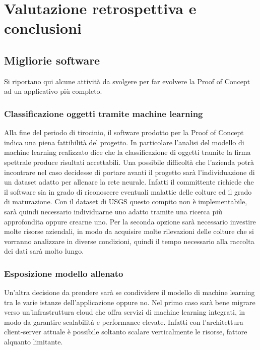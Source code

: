 
\chapter{Valutazione retrospettiva e conclusioni}
\label{cap:conclusione}


\section{Migliorie software}
Si riportano qui alcune attività da svolgere per far evolvere la Proof of Concept ad un applicativo più completo.

\subsection{Classificazione oggetti tramite machine learning}
Alla fine del periodo di tirocinio, il software prodotto per la Proof of Concept indica una piena fattibilità del progetto. In particolare l'analisi del modello di machine learning realizzato dice che la classificazione di oggetti tramite la firma spettrale produce risultati accettabili. Una possibile difficoltà che l'azienda potrà incontrare nel caso decidesse di portare avanti il progetto sarà l'individuazione di un dataset adatto per allenare la rete neurale. Infatti il committente richiede che il software sia in grado di riconoscere eventuali malattie delle colture ed il grado di maturazione. Con il dataset di USGS questo compito non è implementabile, sarà quindi necessario individuarne uno adatto tramite una ricerca più approfondita oppure crearne uno. Per la seconda opzione sarà necessario investire molte risorse aziendali, in modo da acquisire molte rilevazioni delle colture che si vorranno analizzare in diverse condizioni, quindi il tempo necessario alla raccolta dei dati sarà molto lungo.

\subsection{Esposizione modello allenato}
Un'altra decisione da prendere sarà se condividere il modello di machine learning tra le varie istanze dell'applicazione oppure no. Nel primo caso sarà bene migrare verso un'infrastruttura cloud che offra servizi di machine learning integrati, in modo da garantire scalabilità e performance elevate. Infatti con l'architettura client-server attuale è possibile soltanto scalare verticalmente le risorse, fattore alquanto limitante.

